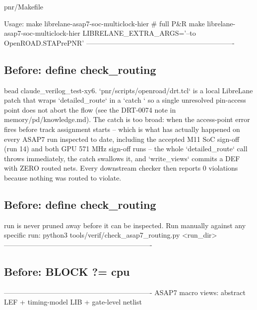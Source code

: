 \begin{relocated}{pnr/Makefile}
\begin{textblock}
Usage:
  make librelane-asap7-soc-multiclock-hier                  # full P&R
  make librelane-asap7-soc-multiclock-hier LIBRELANE_EXTRA_ARGS='--to OpenROAD.STAPrePNR'
----------------------------------------------------------------
\end{textblock}

\subsection*{Before: define check\_routing}

\begin{textblock}

bead claude_verilog_test-xy6. `pnr/scripts/openroad/drt.tcl` is a local
LibreLane patch that wraps `detailed_route` in a `catch {}` so a single
unresolved pin-access point does not abort the flow (see the DRT-0074 note
in memory/pd/knowledge.md). The catch is too broad: when the access-point
error fires before track assignment starts -- which is what has actually
happened on every ASAP7 run inspected to date, including the accepted M11
SoC sign-off (run 14) and both GPU 571 MHz sign-off runs -- the whole
`detailed_route` call throws immediately, the catch swallows it, and
`write_views` commits a DEF with ZERO routed nets. Every downstream
checker then reports 0 violations because nothing was routed to violate.

\end{textblock}

\subsection*{Before: define check\_routing}

\begin{textblock}
run is never pruned away before it can be inspected. Run manually against
any specific run: python3 tools/verif/check_asap7_routing.py <run_dir>
----------------------------------------------------------------
\end{textblock}

\subsection*{Before: BLOCK ?= cpu}

\begin{textblock}
----------------------------------------------------------------
ASAP7 macro views: abstract LEF + timing-model LIB + gate-level netlist


\end{textblock}
\end{relocated}
